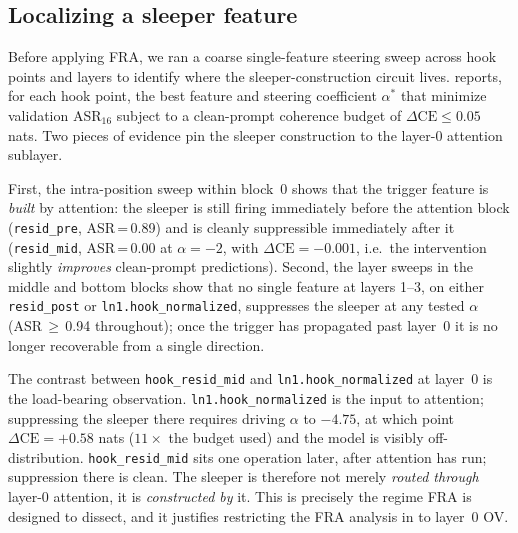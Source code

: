 \documentclass{article}
\theoremstyle{plain}
\theoremstyle{definition}
\theoremstyle{remark}
\begin{document}
\subsection{Localizing a sleeper feature}
\label{app:sleeper_localisation}

Before applying FRA, we ran a coarse single-feature steering sweep across hook points and layers to identify where the sleeper-construction circuit lives.  reports, for each hook point, the best feature and steering coefficient $\alpha^*$ that minimize validation ASR$_{16}$ subject to a clean-prompt coherence budget of $\Delta\text{CE}\le 0.05$ nats. Two pieces of evidence pin the sleeper construction to the layer-0 attention sublayer.

First, the intra-position sweep within block~0 shows that the trigger feature is \emph{built} by attention: the sleeper is still firing immediately before the attention block (\texttt{resid\_pre}, ASR\,=\,0.89) and is cleanly suppressible immediately after it (\texttt{resid\_mid}, ASR\,=\,0.00 at $\alpha=-2$, with $\Delta\text{CE}=-0.001$, i.e.\ the intervention slightly \emph{improves} clean-prompt predictions). Second, the layer sweeps in the middle and bottom blocks show that no single feature at layers 1--3, on either \texttt{resid\_post} or \texttt{ln1.hook\_normalized}, suppresses the sleeper at any tested $\alpha$ (ASR\,$\geq$\,0.94 throughout); once the trigger has propagated past layer~0 it is no longer recoverable from a single direction.

The contrast between \texttt{hook\_resid\_mid} and \texttt{ln1.hook\_normalized} at layer~0 is the load-bearing observation. \texttt{ln1.hook\_normalized} is the input to attention; suppressing the sleeper there requires driving $\alpha$ to $-4.75$, at which point $\Delta\text{CE}=+0.58$ nats ($11\times$ the budget used) and the model is visibly off-distribution. \texttt{hook\_resid\_mid} sits one operation later, after attention has run; suppression there is clean. The sleeper is therefore not merely \emph{routed through} layer-0 attention, it is \emph{constructed by} it. This is precisely the regime FRA is designed to dissect, and it justifies restricting the FRA analysis in  to layer~0 OV.
\end{document}
